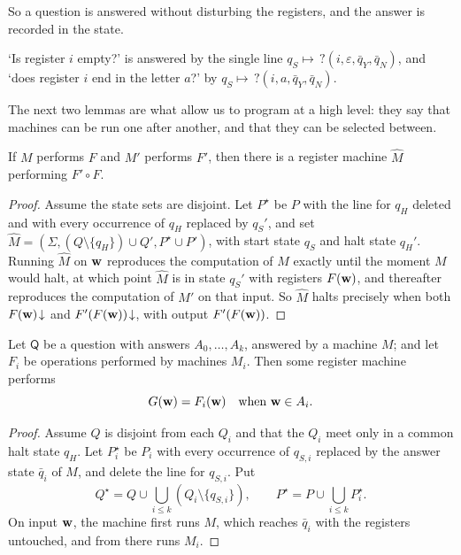 \documentclass[a4paper]{scrartcl}
\newcommand{\eps}{\varepsilon}
\begin{document}
So a question is answered without disturbing the registers, and the answer is recorded in the state.

\begin{example}
	`Is register $i$ empty?' is answered by the single line $q_S \mapsto\, ?(i,\eps,\bar q_Y, \bar q_N)$, and `does register $i$ end in the letter $a$?' by $q_S \mapsto\, ?(i,a,\bar q_Y, \bar q_N)$.
\end{example}

The next two lemmas are what allow us to program at a high level: they say that machines can be run one after another, and that they can be selected between.

\begin{lemma}[Concatenation]\label{lem:concat}
	If $M$ performs $F$ and $M'$ performs $F'$, then there is a register machine $\hat M$ performing $F' \circ F$.
\end{lemma}

\begin{proof}
	Assume the state sets are disjoint. Let $P^\star$ be $P$ with the line for $q_H$ deleted and with every occurrence of $q_H$ replaced by $q_S'$, and set $\hat M = (\Sigma, (Q\setminus\{q_H\})\cup Q', P^\star \cup P')$, with start state $q_S$ and halt state $q_H'$. Running $\hat M$ on $\mathbf{w}$ reproduces the computation of $M$ exactly until the moment $M$ would halt, at which point $\hat M$ is in state $q_S'$ with registers $F(\mathbf{w})$, and thereafter reproduces the computation of $M'$ on that input. So $\hat M$ halts precisely when both $F(\mathbf{w})\!\downarrow$ and $F'(F(\mathbf{w}))\!\downarrow$, with output $F'(F(\mathbf{w}))$.
\end{proof}

\begin{lemma}\label{lem:cases}
	Let $\mathsf{Q}$ be a question with answers $A_0, \dots, A_k$, answered by a machine $M$; and let $F_i$ be operations performed by machines $M_i$. Then some register machine performs
	$$G(\mathbf{w}) = F_i(\mathbf{w}) \quad\text{when } \mathbf{w} \in A_i.$$
\end{lemma}

\begin{proof}
	Assume $Q$ is disjoint from each $Q_i$ and that the $Q_i$ meet only in a common halt state $q_H$. Let $P_i^\star$ be $P_i$ with every occurrence of $q_{S,i}$ replaced by the answer state $\bar q_i$ of $M$, and delete the line for $q_{S,i}$. Put
	$$Q^\star = Q \cup \bigcup_{i\leq k}(Q_i\setminus\{q_{S,i}\}), \qquad P^\star = P \cup \bigcup_{i\leq k}P_i^\star.$$
	On input $\mathbf{w}$, the machine first runs $M$, which reaches $\bar q_i$ with the registers untouched, and from there runs $M_i$.
\end{proof}
\end{document}
